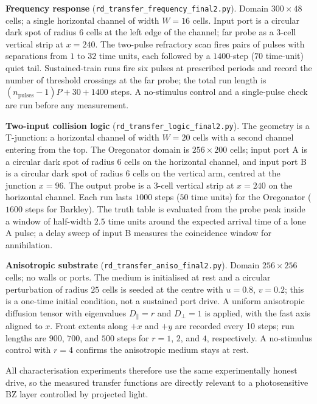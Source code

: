 \textbf{Frequency response} (\texttt{rd\_transfer\_frequency\_final2.py}).
Domain $300 \times 48$ cells; a single horizontal channel of width $W = 16$ cells.
Input port is a circular dark spot of radius 6 cells at the left edge of the channel; far probe as a 3-cell vertical strip at $x = 240$.
The two-pulse refractory scan fires pairs of pulses with separations from $1$ to $32$ time units, each followed by a $1400$-step ($70$ time-unit) quiet tail.
Sustained-train runs fire six pulses at prescribed periods and record the number of threshold crossings at the far probe; the total run length is $(n_{\mathrm{pulses}}-1)P + 30 + 1400$ steps.
A no-stimulus control and a single-pulse check are run before any measurement.

\textbf{Two-input collision logic} (\texttt{rd\_transfer\_logic\_final2.py}).
The geometry is a T-junction: a horizontal channel of width $W = 20$ cells with a second channel entering from the top.
The Oregonator domain is $256 \times 200$ cells; input port A is a circular dark spot of radius 6 cells on the horizontal channel, and input port B is a circular dark spot of radius 6 cells on the vertical arm, centred at the junction $x = 96$.
The output probe is a 3-cell vertical strip at $x = 240$ on the horizontal channel.
Each run lasts $1000$ steps ($50$ time units) for the Oregonator ($1600$ steps for Barkley).
The truth table is evaluated from the probe peak inside a window of half-width $2.5$ time units around the expected arrival time of a lone A pulse; a delay sweep of input B measures the coincidence window for annihilation.

\textbf{Anisotropic substrate} (\texttt{rd\_transfer\_aniso\_final2.py}).
Domain $256 \times 256$ cells; no walls or ports.
The medium is initialised at rest and a circular perturbation of radius $25$ cells is seeded at the centre with $u = 0.8$, $v = 0.2$; this is a one-time initial condition, not a sustained port drive.
A uniform anisotropic diffusion tensor with eigenvalues $D_{\parallel} = r$ and $D_{\perp} = 1$ is applied, with the fast axis aligned to $x$.
Front extents along $+x$ and $+y$ are recorded every 10 steps; run lengths are $900$, $700$, and $500$ steps for $r = 1$, $2$, and $4$, respectively.
A no-stimulus control with $r = 4$ confirms the anisotropic medium stays at rest.

All characterisation experiments therefore use the same experimentally honest drive, so the measured transfer functions are directly relevant to a photosensitive BZ layer controlled by projected light.

